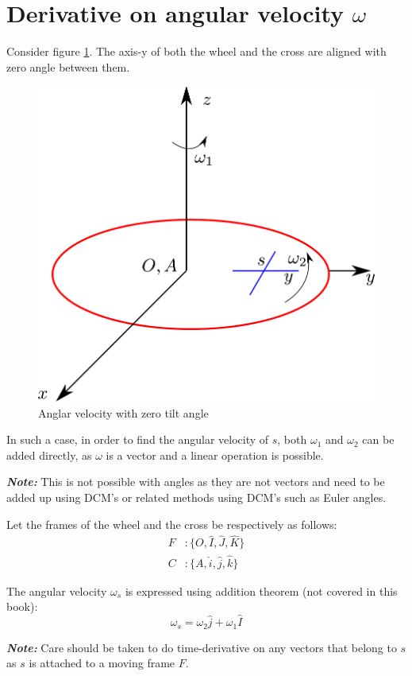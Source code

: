 \section{Derivative on angular velocity $\omega$}

Consider figure \ref{fig_0_ch_0_omegawithZerotiltAngle}. The axis-y of both the wheel and the cross are aligned with zero angle between them. 
\begin{figure}[h!]
	\centering
	\includegraphics[width=0.5\linewidth]{Bilder/14_timeDerivativeAngVeocity.pdf}
	\caption{Anglar velocity with zero tilt angle}
	\label{fig_0_ch_0_omegawithZerotiltAngle}
\end{figure}

In such a case, in order to find the angular velocity of $s$, both $\omega_{1}$ and $\omega_{2}$ can be added directly, as $\omega$ is a vector and a linear operation is possible.

\textbf{\textit{Note: }}This is not possible with angles as they are not vectors and need to be added up using DCM's or related methods using DCM's such as Euler angles.

Let the frames of the wheel and the cross be respectively as follows:
\begin{align*}
	F &:\{ O, \hat{I}, \hat{J}, \hat{K} \} \\
	C &:\{ A, \hat{i}, \hat{j}, \hat{k} \}
\end{align*}

The angular velocity $\omega_{s}$ is expressed using addition theorem (not covered in this book):
\begin{equation}
	\omega_{s} = \omega_{2} \hat{j} + \omega_{1}\hat{I}
\end{equation}

\textbf{\textit{Note: }} Care should be taken to do time-derivative on any vectors that belong to $s$ as $s$ is attached to a moving frame $F$.

